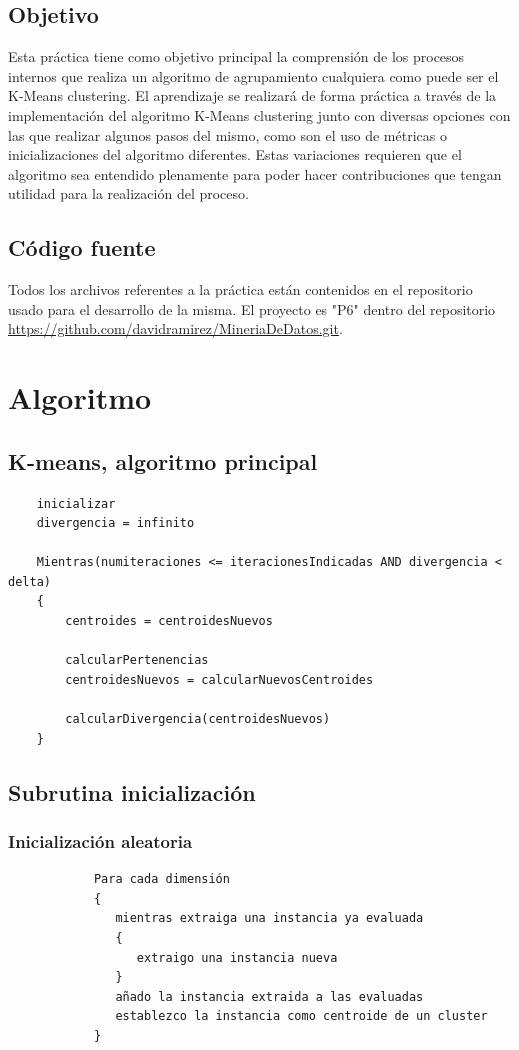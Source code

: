 \documentclass[a4paper]{report}
\begin{document}
	\section{Objetivo}
	
	Esta práctica tiene como objetivo principal la comprensión de los procesos internos que realiza un algoritmo de agrupamiento cualquiera como puede ser el K-Means clustering. El aprendizaje se realizará de forma práctica a través de la implementación del algoritmo K-Means clustering junto con diversas opciones con las que realizar algunos pasos del mismo, como son el uso de métricas o inicializaciones del algoritmo diferentes.	Estas variaciones requieren que el algoritmo sea entendido plenamente para poder hacer contribuciones que tengan utilidad para la realización del proceso.

	\section{Código fuente}
	
	Todos los archivos referentes a la práctica están contenidos en el repositorio usado para el desarrollo de la misma. El proyecto es "P6" dentro del repositorio \url{https://github.com/davidramirez/MineriaDeDatos.git}.
	
\chapter{Algoritmo}

	\section{K-means, algoritmo principal}
	
	\begin{verbatim}
	inicializar
	divergencia = infinito 
	
	Mientras(numiteraciones <= iteracionesIndicadas AND divergencia < delta)
	{
	    centroides = centroidesNuevos 
	
	    calcularPertenencias
	    centroidesNuevos = calcularNuevosCentroides
		
	    calcularDivergencia(centroidesNuevos) 
	}
	\end{verbatim}
	
	\section{Subrutina inicialización}
		\subsection{Inicialización aleatoria}
			\begin{verbatim}
			Para cada dimensión
			{
			   mientras extraiga una instancia ya evaluada
			   {
			      extraigo una instancia nueva
			   }
			   añado la instancia extraida a las evaluadas
			   establezco la instancia como centroide de un cluster
			}
			\end{verbatim}
		
\end{document}
